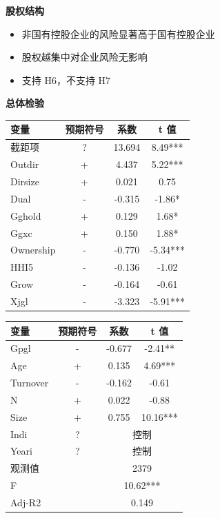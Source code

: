 \documentclass[aspectratio=169,UTF8,zihao=-4]{ctexbeamer}
\newcommand{\bigidea}[1]{
  \begin{center}
    \vspace{0.8em}
    {\LARGE \bfseries #1}
    \vspace{0.6em}
  \end{center}
}
\begin{document}
\begin{frame}
  \bigidea{股权结构}
  \begin{itemize}
    \item \Large 非国有控股企业的风险显著高于国有控股企业
    \item \Large 股权越集中对企业风险无影响
    \item \Large 支持 H6，不支持 H7
  \end{itemize}
\end{frame}

\begin{frame}
  \bigidea{总体检验}
  \large
  \centering
  \begin{tabular}{lccc}
    \toprule
    变量 & 预期符号 & 系数 & t 值 \\
    \midrule
    截距项 & ? & 13.694 & 8.49*** \\
    Outdir & + & 4.437 & 5.22*** \\
    Dirsize & + & 0.021 & 0.75 \\
    Dual & - & -0.315 & -1.86* \\
    Gghold & + & 0.129 & 1.68* \\
    Ggxc & + & 0.150 & 1.88* \\
    Ownership & - & -0.770 & -5.34*** \\
    HHI5 & - & -0.136 & -1.02 \\
    Grow & - & -0.164 & -0.61 \\
    Xjgl & - & -3.323 & -5.91*** \\
    \bottomrule
  \end{tabular}
\end{frame}

\begin{frame}
  \centering
  \large
  \begin{tabular}{lccc}
    \toprule
    变量 & 预期符号 & 系数 & t 值 \\
    \midrule
    Gpgl & - & -0.677 & -2.41** \\
    Age & + & 0.135 & 4.69*** \\
    Turnover & - & -0.162 & -0.61 \\
    N & + & 0.022 & -0.88 \\
    Size & + & 0.755 & 10.16*** \\
    Indi & ? & \multicolumn{2}{c}{控制} \\
    Yeari & ? & \multicolumn{2}{c}{控制} \\
    观测值 &  & \multicolumn{2}{c}{2379} \\
    F &  & \multicolumn{2}{c}{10.62***} \\
    Adj-R2 &  & \multicolumn{2}{c}{0.149} \\
    \bottomrule
  \end{tabular}
\end{frame}
\end{document}
